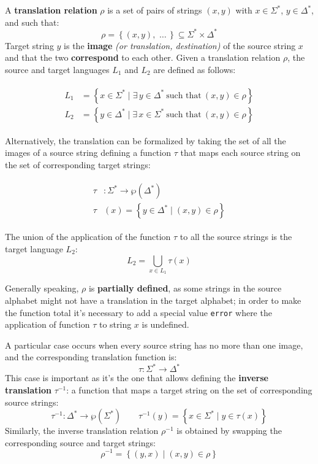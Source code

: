 \documentclass[english]{article}
\begin{document}
A \textbf{translation relation} \(\rho\) is a set of pairs of strings \(\left( x, y \right)\) with \(x \in \Sigma^\ast\), \(y \in \Delta^\ast\), and such that:
\[ \rho = \left\{ \left( x, y \right), \, \,\ldots\, \right\} \subseteq \Sigma^\ast \times \Delta^\ast \]
Target string \(y\) is the \textbf{image} \textit{(or translation, destination)} of the source string \(x\) and that the two \textbf{correspond} to each other.
Given a translation relation \(\rho\), the source and target languages \(L_1\) and \(L_2\) are defined as follows:

\begin{gather*}
  \begin{aligned}
    L_1 & = \left\{ x \in \Sigma^\ast \mid \exists\, y \in \Delta^\ast \ \text{such that} \ \left( x, y \right) \in \rho \right\} \\
    L_2 & = \left\{ y \in \Delta^\ast \mid \exists\, x \in \Sigma^\ast \ \text{such that} \ \left( x, y \right) \in \rho \right\}
  \end{aligned}
\end{gather*}

Alternatively, the translation can be formalized by taking the set of all the images of a source string defining a function \(\tau\) that maps each source string on the set of corresponding target strings:

\begin{gather*}
  \begin{aligned}
    \tau & : \Sigma^\ast \rightarrow \wp \left( \Delta^\ast \right)                    \\
    \tau & (x)  = \left\{ y \in \Delta^\ast \mid \left( x, y \right) \in \rho \right\}
  \end{aligned}
\end{gather*}

The union of the application of the function \(\tau\) to all the source strings is the target language \(L_2\):
\[ L_2 = \bigcup_{x \in L_1} \tau(x) \]

Generally speaking, \(\rho\) is \textbf{partially defined}, as some strings in the source alphabet might not have a translation in the target alphabet;
in order to make the function total it's necessary to add a special value \texttt{error} where the application of function \(\tau\) to string \(x\) is undefined.

A particular case occurs when every source string has no more than one image, and the corresponding translation function is:
\[ \tau : \Sigma^\ast \rightarrow \Delta^\ast \]
This case is important as it's the one that allows defining the \textbf{inverse translation} \(\tau^{-1}\):
a function that maps a target string on the set of corresponding source strings:
\[ \tau^{-1} : \Delta^\ast \rightarrow \wp\left( \Sigma^\ast \right) \qquad \tau^{-1}(y) = \left\{ x \in \Sigma^\ast \mid y \in \tau(x) \right\} \]
Similarly, the inverse translation relation \(\rho^{-1}\) is obtained by swapping the corresponding source and target strings:
\[ \rho^{-1} = \left\{ \left( y, x \right) \mid \left( x, y \right) \in \rho \right\} \]
\end{document}
